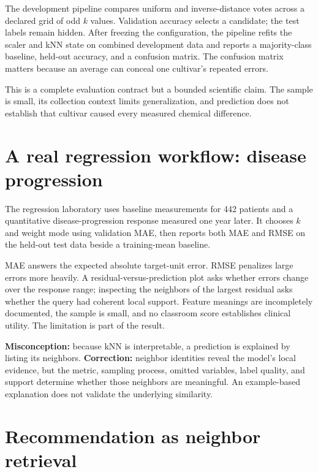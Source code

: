 The development pipeline compares uniform and inverse-distance votes across a
declared grid of odd $k$ values. Validation accuracy selects a candidate; the
test labels remain hidden. After freezing the configuration, the pipeline refits
the scaler and kNN state on combined development data and reports a
majority-class baseline, held-out accuracy, and a confusion matrix. The
confusion matrix matters because an average can conceal one cultivar's repeated
errors.

This is a complete evaluation contract but a bounded scientific claim. The
sample is small, its collection context limits generalization, and prediction
does not establish that cultivar caused every measured chemical difference.

\section{A real regression workflow: disease progression}

The regression laboratory uses baseline measurements for 442 patients and a
quantitative disease-progression response measured one year later. It chooses
$k$ and weight mode using validation MAE, then reports both MAE and RMSE on the
held-out test data beside a training-mean baseline.

MAE answers the expected absolute target-unit error. RMSE penalizes large errors
more heavily. A residual-versus-prediction plot asks whether errors change over
the response range; inspecting the neighbors of the largest residual asks
whether the query had coherent local support. Feature meanings are incompletely
documented, the sample is small, and no classroom score establishes clinical
utility. The limitation is part of the result.

\begin{misconceptionbox}
\textbf{Misconception:} because kNN is interpretable, a prediction is explained
by listing its neighbors. \textbf{Correction:} neighbor identities reveal the
model's local evidence, but the metric, sampling process, omitted variables,
label quality, and support determine whether those neighbors are meaningful.
An example-based explanation does not validate the underlying similarity.
\end{misconceptionbox}

\section{Recommendation as neighbor retrieval}

